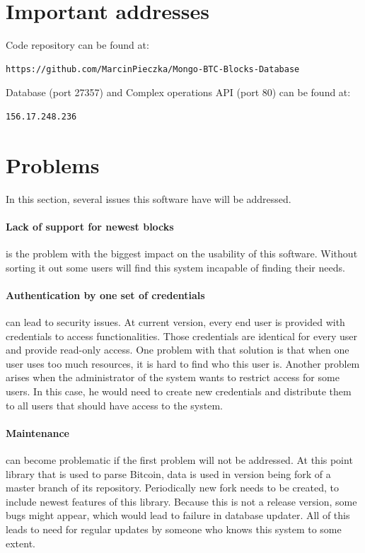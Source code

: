 \documentclass[12pt, en, eng, oneside, final]{mgr}
\begin{document}
\section{Important addresses}
Code repository can be found at:
\begin{verbatim}
https://github.com/MarcinPieczka/Mongo-BTC-Blocks-Database
\end{verbatim}
\noindent
Database (port 27357) and Complex operations API (port 80) can be found at:
\begin{verbatim}
156.17.248.236
\end{verbatim}

\section{Problems}
In this section, several issues this software have will be addressed.

\paragraph{Lack of support for newest blocks} is the problem with the biggest impact on the usability of this software. Without sorting it out some users will find this system incapable of finding their needs. 

\paragraph{Authentication by one set of credentials} can lead to security issues. At current version, every end user is provided with credentials to access functionalities. Those credentials are identical for every user and provide read-only access. One problem with that solution is that when one user uses too much resources, it is hard to find who this user is. Another problem arises when the administrator of the system wants to restrict access for some users. In this case, he would need to create new credentials and distribute them to all users that should have access to the system.

\paragraph{Maintenance} can become problematic if the first problem will not be addressed. At this point library that is used to parse Bitcoin, data is used in version being fork of a master branch of its repository. Periodically new fork needs to be created, to include newest features of this library. Because this is not a release version, some bugs might appear, which would lead to failure in database updater. All of this leads to need for regular updates by someone who knows this system to some extent. 
\end{document}
